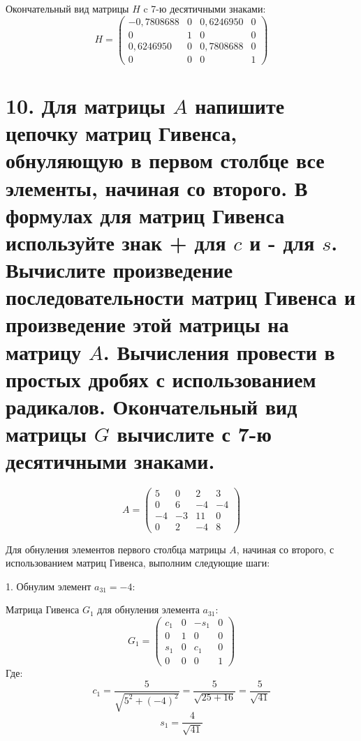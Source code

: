 \documentclass[a4paper,14pt]{article}
\begin{document}
Окончательный вид матрицы $H$ c 7-ю десятичными знаками:
$$
H = \begin{pmatrix}
        -0,7808688 & 0 & 0,6246950 & 0 \\
        0          & 1 & 0         & 0 \\
        0,6246950  & 0 & 0,7808688 & 0 \\
        0          & 0 & 0         & 1
    \end{pmatrix}
$$

\section{10. Для матрицы $A$ напишите цепочку матриц Гивенса, обнуляющую в первом столбце все элементы, начиная со второго. В формулах для матриц Гивенса используйте знак + для $c$ и - для $s$. Вычислите произведение последовательности матриц Гивенса и произведение этой матрицы на матрицу $A$. Вычисления провести в простых дробях с использованием радикалов. Окончательный вид матрицы $G$ вычислите с 7-ю десятичными знаками.}
$$
A = \begin{pmatrix}
5 & 0 & 2 & 3 \\
0 & 6 & -4 & -4 \\
-4 & -3 & 11 & 0 \\
0 & 2 & -4 & 8
\end{pmatrix}
$$

Для обнуления элементов первого столбца матрицы \( A \), начиная со второго, с использованием матриц Гивенса, выполним следующие шаги:

1. Обнулим элемент \( a_{31} = -4 \):

   Матрица Гивенса \( G_1 \) для обнуления элемента \( a_{31} \):
   \[
   G_1 = \begin{pmatrix}
   c_1 & 0 & -s_1 & 0 \\
   0 & 1 & 0 & 0 \\
   s_1 & 0 & c_1 & 0 \\
   0 & 0 & 0 & 1
   \end{pmatrix}
   \]
   Где:
   \[
   c_1 = \frac{5}{\sqrt{5^2 + (-4)^2}} = \frac{5}{\sqrt{25 + 16}} = \frac{5}{\sqrt{41}}
   \]
   \[
   s_1 = \frac{4}{\sqrt{41}}
   \]
\end{document}
